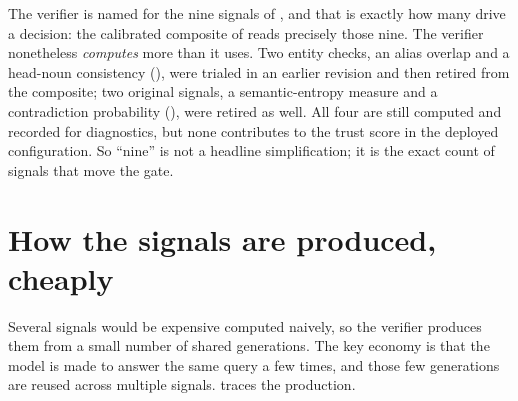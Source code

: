 \begin{pitfall}
The verifier is named for the nine signals of , and that is
exactly how many drive a decision: the calibrated composite of 
reads precisely those nine. The verifier nonetheless \emph{computes} more than it
uses. Two entity checks, an alias overlap and a head-noun consistency
(), were trialed in an earlier revision and then retired
from the composite; two original signals, a semantic-entropy measure and a
contradiction probability (), were retired as well. All
four are still computed and recorded for diagnostics, but none contributes to the
trust score in the deployed configuration. So ``nine'' is not a headline
simplification; it is the exact count of signals that move the gate.
\end{pitfall}

\section{How the signals are produced, cheaply}
\label{sec:verifier-dataflow}

Several signals would be expensive computed naively, so the verifier produces them
from a small number of shared generations. The key economy is that the model is
made to answer the same query a few times, and those few generations are reused
across multiple signals.  traces the production.

